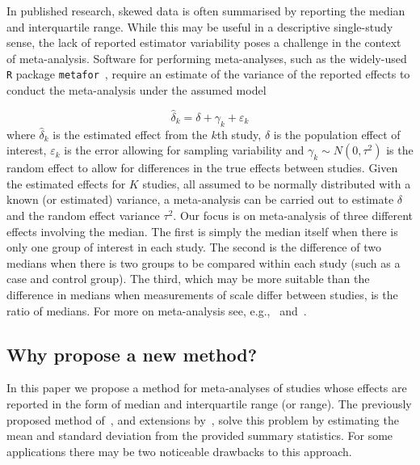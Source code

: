 \documentclass{article}
\begin{document}
In published research, skewed data is often summarised by reporting the median and interquartile range. While this may be useful in a descriptive single-study sense, the lack of reported estimator variability poses a challenge in the context of meta-analysis.  Software for performing meta-analyses, such as the widely-used \texttt{R} package \texttt{metafor}~\cite{viechtbauerConductingMetaanalysesMetafor2010}, require an estimate of the variance of the reported effects to conduct the meta-analysis under the assumed model

\begin{equation}
\widehat{\delta}_k=\delta + \gamma_k + \varepsilon_k
\end{equation}
where $\widehat{\delta}_k$ is the estimated effect from the $k$th study, $\delta$ is the population effect of interest, $\varepsilon_k$ is the error allowing for sampling variability and $\gamma_k\sim N(0,\tau^2)$ is the random effect to allow for differences in the true effects between studies.  Given the estimated effects for $K$ studies, all assumed to be normally distributed with a known (or estimated) variance, a meta-analysis can be carried out to estimate $\delta$ and the random effect variance $\tau^2$.  Our focus is on meta-analysis of three different effects involving the median.  The first is simply the median itself when there is only one group of interest in each study.  The second is the difference of two medians when there is two groups to be compared within each study (such as a case and control group).  The third, which may be more suitable than the difference in medians when measurements of scale differ between studies, is the ratio of medians.   For more on meta-analysis see, e.g.,~\cite{borenstein2008introduction} and~\cite{kulinskaya2008meta}.

\subsection{Why propose a new method?}

In this paper we propose a method for meta-analyses of studies whose effects are reported in the form of median and interquartile range (or range). The previously proposed method of~\cite{hozoEstimatingMeanVariance2005}, and extensions by~\cite{blandEstimatingMeanStandard2014, wanEstimatingSampleMean2014}, solve this problem by estimating the mean and standard deviation from the provided summary statistics. For some applications there may be two noticeable drawbacks to this approach.
\end{document}
